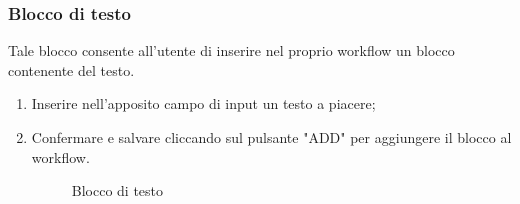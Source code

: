 \subsubsection{Blocco di testo}
Tale blocco consente all'utente di inserire nel proprio workflow un blocco contenente del testo.
\begin{enumerate}
	\item Inserire nell'apposito campo di input un testo a piacere;
	\item Confermare e salvare cliccando sul pulsante "ADD" per aggiungere il blocco al workflow.
	\begin{figure}[!ht]
		\centering
		\caption{Blocco di testo}
	\end{figure}
\end{enumerate}

